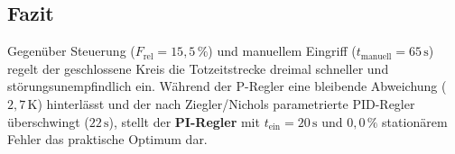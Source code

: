 \documentclass[a4paper,10pt,department=FakEI]{OTHRartcl}
\begin{document}
\subsection{Fazit}
Gegenüber Steuerung ($F_{\text{rel}} = 15{,}5\,\%$) und manuellem Eingriff ($t_{\text{manuell}} = 65\,\text{s}$) regelt der geschlossene Kreis die Totzeitstrecke dreimal schneller und störungsunempfindlich ein. Während der P-Regler eine bleibende Abweichung ($2{,}7\,\text{K}$) hinterlässt und der nach Ziegler/Nichols parametrierte PID-Regler überschwingt ($22\,\text{s}$), stellt der \textbf{PI-Regler} mit $t_{\text{ein}} = 20\,\text{s}$ und $0{,}0\,\%$ stationärem Fehler das praktische Optimum dar.

\label{doc:lastpage}
\end{document}
